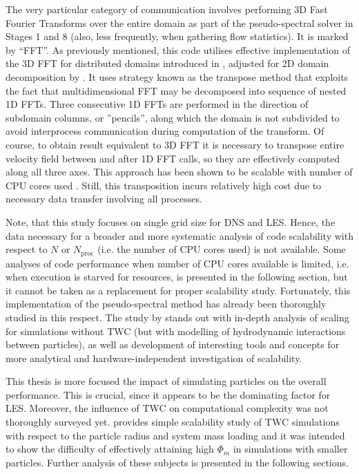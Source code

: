 \documentclass{pracamgren}
\begin{document}
The very particular category of communication involves performing 3D Fast Fourier Transforms over the entire domain  as part of the pseudo-spectral solver in Stages 1 and 8 (also, less frequently, when gathering flow statistics).
It is marked by ``FFT''.
As previously mentioned, this code utilises effective implementation of the 3D FFT for distributed domains introduced in \textcite{Dmitruk2001}, adjusted for 2D domain decomposition by \textcite{Ayala2013}.
It uses strategy known as the transpose method that exploits the fact that multidimensional FFT may be decomposed into sequence of nested 1D FFTs.
Three consecutive 1D FFTs are performed in the direction of subdomain columns, or ''pencils'', along which the domain is not subdivided to avoid interprocess communication during computation of the transform.
Of course, to obtain result equivalent to 3D FFT it is necessary to transpose entire velocity field between and after 1D FFT calls, so they are effectively computed along all three axes.
This approach has been shown to be scalable with number of CPU cores used \parencite{Dmitruk2001,Ayala2013}.
Still, this transposition incurs relatively high cost due to necessary data transfer involving all processes.

\smallskip

Note, that this study focuses on single grid size for DNS and LES.
Hence, the data necessary for a broader and more systematic analysis of code scalability with respect to $N$ or $N_{\text{proc}}$ (i.e. the number of CPU cores used) is not available.
Some analyses of code performance when number of CPU cores available is limited, i.e. when execution is starved for resources, is presented in the following section, but it cannot be taken as a replacement for proper scalability study.
Fortunately, this implementation of the pseudo-spectral method has already been thoroughly studied in this respect.
The study by \textcite{Ayala2014} stands out with in-depth analysis of scaling for simulations without TWC (but with modelling of hydrodynamic interactions between particles), as well as development of interesting tools and concepts for more analytical and hardware-independent investigation of scalability. 

This thesis is more focused the impact of simulating particles on the overall performance.
This is crucial, since it appears to be the dominating factor for LES.
Moreover, the influence of TWC on computational complexity was not thoroughly surveyed yet.
\textcite[Figure~1 therein]{Rosa2022} provides simple scalability study of TWC simulations with respect to the particle radius and system mass loading and it was intended to show the difficulty of effectively attaining high $\Phi_m$ in simulations with smaller particles.
Further analysis of these subjects is presented in the following sections.
\end{document}
